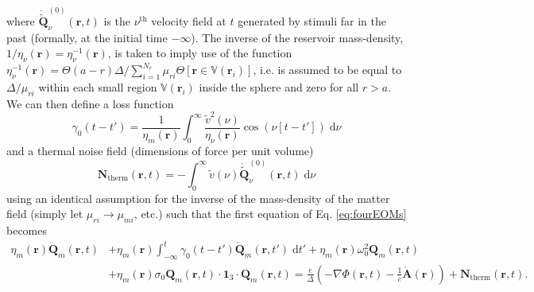 \documentclass{article}
\begin{document}
where $\dot{\tilde{\mathbf{Q}}}^{(0)}_\nu(\mathbf{r},t)$ is the $\nu^\mathrm{th}$ velocity field at $t$ generated by stimuli far in the past (formally, at the initial time $-\infty$). The inverse of the reservoir mass-density, $1/\eta_\nu(\mathbf{r}) = \eta_\nu^{-1}(\mathbf{r})$, is taken to imply use of the function $\eta_\nu^{-1}(\mathbf{r}) = \Theta(a - r)\Delta/\sum_{i = 1}^{N_r}\mu_{ri}\Theta[\mathbf{r}\in\mathbb{V}(\mathbf{r}_i)]$, i.e. is assumed to be equal to $\Delta/\mu_{ri}$ within each small region $\mathbb{V}(\mathbf{r}_i)$ inside the sphere and zero for all $r > a$. We can then define a loss function
\begin{equation}
\gamma_0(t - t') = \frac{1}{\eta_m(\mathbf{r})}\int_0^\infty\frac{\tilde{v}^2(\nu)}{\eta_\nu(\mathbf{r})}\cos(\nu[t - t'])\;\mathrm{d}\nu
\end{equation}
and a thermal noise field (dimensions of force per unit volume)
\begin{equation}
\mathbf{N}_\mathrm{therm}(\mathbf{r},t) = -\int_0^\infty\tilde{v}(\nu)\dot{\tilde{\mathbf{Q}}}^{(0)}_\nu(\mathbf{r},t)\;\mathrm{d}\nu
\end{equation}
using an identical assumption for the inverse of the mass-density of the matter field (simply let $\mu_{ri}\to\mu_{mi}$, etc.) such that the first equation of Eq. \eqref{eq:fourEOMs} becomes
\begin{equation}\label{eq:matterEOM}
\begin{split}
\eta_m(\mathbf{r})\ddot{\mathbf{Q}}_m(\mathbf{r},t) &+ \eta_m(\mathbf{r})\int_{-\infty}^t\gamma_0(t - t')\dot{\mathbf{Q}}_m(\mathbf{r},t')\;\mathrm{d}t' + \eta_m(\mathbf{r})\omega_0^2\mathbf{Q}_m(\mathbf{r},t)\\
&+ \eta_m(\mathbf{r})\sigma_0\mathbf{Q}_m(\mathbf{r},t)\cdot\bm{1}_3\cdot\mathbf{Q}_m(\mathbf{r},t) = \frac{e}{\Delta}\left(-\nabla\Phi(\mathbf{r},t) - \frac{1}{c}\dot{\mathbf{A}}(\mathbf{r})\right) + \mathbf{N}_\mathrm{therm}(\mathbf{r},t).
\end{split}
\end{equation}
\end{document}
